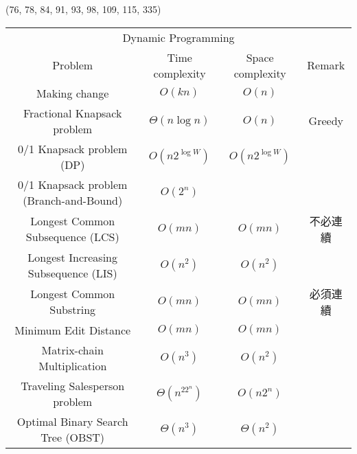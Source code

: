 \item \begin{theorem}{(76, 78, 84, 91, 93, 98, 109, 115, 335)} \quad\quad
    \begin{table}[H]
        \centering
        \begin{tabular}{|c|c|c|c|}
            \hline
            \multicolumn{4}{|c|}{Dynamic Programming} \\
            \Xhline{3\arrayrulewidth}
            Problem & Time complexity & Space complexity & Remark \\
            \Xhline{2\arrayrulewidth}
            Making change & $O(kn)$ & $O(n)$ & \\
            \hline
            Fractional Knapsack problem & $\Theta(n\log n)$ & $O(n)$ & Greedy \\
            \hline
            0/1 Knapsack problem (DP) & $O(n2^{\log W})$ & $O(n2^{\log W})$ & \\
            \hline
            0/1 Knapsack problem (Branch-and-Bound) & $O(2^n)$ & & \\
            \hline
            Longest Common Subsequence (LCS) & $O(mn)$ & $O(mn)$ & 不必連續 \\
            \hline
            Longest Increasing Subsequence (LIS) & $O(n^2)$ & $O(n^2)$ & \\
            \hline
            Longest Common Substring & $O(mn)$ & $O(mn)$ & 必須連續 \\
            \hline
            Minimum Edit Distance & $O(mn)$ & $O(mn)$ & \\
            \hline
            Matrix-chain Multiplication & $O(n^3)$ & $O(n^2)$ & \\
            \hline
            Traveling Salesperson problem & $\Theta(n^22^n)$ & $O(n2^n)$ & \\
            \hline
            Optimal Binary Search Tree (OBST) & $\Theta(n^3)$ & $\Theta(n^2)$ & \\
            \hline
        \end{tabular}
    \end{table}
\end{theorem}
